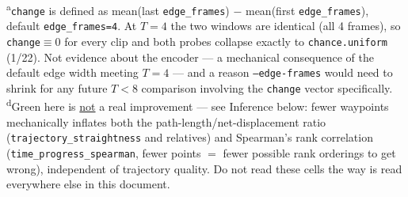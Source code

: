 \begin{table}[H]
\vspace{0.3em}
{\footnotesize \textsuperscript{a}\texttt{change} is defined as mean(last \texttt{edge\_frames})
$-$ mean(first \texttt{edge\_frames}), default \texttt{edge\_frames=4}. At $T=4$ the two
windows are identical (all 4 frames), so \texttt{change}$\equiv 0$ for every clip and
both probes collapse exactly to \texttt{chance.uniform} (1/22). Not evidence about the
encoder --- a mechanical consequence of the default edge width meeting $T=4$ --- and a
reason \texttt{--edge-frames} would need to shrink for any future $T<8$ comparison
involving the \texttt{change} vector specifically. \quad
\textsuperscript{d}Green here is \underline{not} a real improvement --- see Inference
below: fewer waypoints mechanically inflates both the path-length/net-displacement ratio
(\texttt{trajectory\_straightness} and relatives) and Spearman's rank correlation
(\texttt{time\_progress\_spearman}, fewer points $=$ fewer possible rank orderings to get
wrong), independent of trajectory quality. Do not read these cells the way 
is read everywhere else in this document.}
\end{table}


